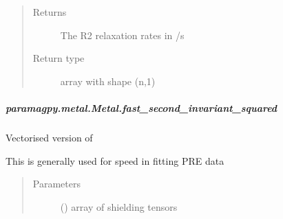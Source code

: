 \documentclass[a4paper,10pt,english,openany,oneside]{sphinxmanual}
\begin{document}
\begin{fulllineitems}
\begin{fulllineitems}
\begin{fulllineitems}
\begin{quote}
\begin{description}
\begin{itemize}
\end{itemize}

\item[{Returns}] \leavevmode
\sphinxAtStartPar
{} \textendash{} The R2 relaxation rates in /s

\item[{Return type}] \leavevmode
\sphinxAtStartPar
array with shape (n,1)

\end{description}\end{quote}

\end{fulllineitems}



\subparagraph{paramagpy.metal.Metal.fast\_second\_invariant\_squared}
\label{\detokenize{reference/generated/paramagpy.metal.Metal.fast_second_invariant_squared:paramagpy-metal-metal-fast-second-invariant-squared}}\label{\detokenize{reference/generated/paramagpy.metal.Metal.fast_second_invariant_squared::doc}}

\begin{fulllineitems}
\label{\detokenize{reference/generated/paramagpy.metal.Metal.fast_second_invariant_squared:paramagpy.metal.Metal.fast_second_invariant_squared}}
\sphinxAtStartPar
Vectorised version of
{\hyperref[\detokenize{reference/generated/paramagpy.metal.Metal.second_invariant_squared:paramagpy.metal.Metal.second_invariant_squared}]{}}

\sphinxAtStartPar
This is generally used for speed in fitting PRE data
\begin{quote}\begin{description}
\item[{Parameters}] \leavevmode
\sphinxAtStartPar
{} (\sphinxstyleliteralemphasis{\sphinxupquote{ (}}\sphinxstyleliteralemphasis{\sphinxupquote{,}}\sphinxstyleliteralemphasis{\sphinxupquote{,}}\sphinxstyleliteralemphasis{\sphinxupquote{)}}) \textendash{} array of shielding tensors


\end{description}
\end{quote}
\end{fulllineitems}
\end{fulllineitems}
\end{fulllineitems}
\end{document}
